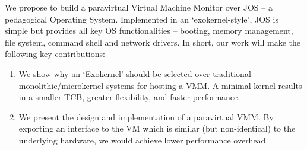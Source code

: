 \vspace{5px} \noindent We propose to build a paravirtual Virtual Machine Monitor over JOS -- a pedagogical Operating System. Implemented in an `exokernel-style', JOS is simple but provides all key OS functionalities -- booting, memory management, file system, command shell and network drivers. In short, our work will make the following key contributions:

\begin{enumerate}
\item We show why an `Exokernel' should be selected over traditional monolithic/microkernel systems for hosting a VMM. A minimal kernel results in a smaller TCB, greater flexibility, and faster performance. 
\item We present the design and implementation of a paravirtual VMM. By exporting an interface to the VM which is similar (but non-identical) to the underlying hardware, we would achieve lower performance overhead.
\end{enumerate}
